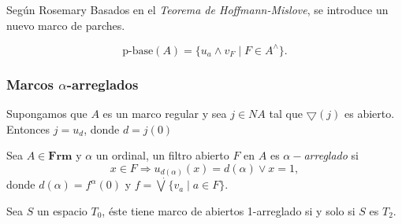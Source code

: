 \documentclass[compress,12pt]{beamer}
\begin{document}
\begin{frame}{Según Rosemary}
    Basados en el \emph{Teorema de Hoffmann-Mislove}, se introduce un nuevo marco de parches.

\[\text{p-base}(A) =\{u_{a}\wedge v_{F}\mid F\in A^{\wedge}\}.\]


\end{frame}

\begin{frame}
\frametitle{Marcos $\alpha$-arreglados}

\begin{theorem}
    Supongamos que $A$ es un marco regular y sea $j\in NA$ tal que $\bigtriangledown (j)$ es abierto. Entonces $j=u_d$, donde $d=j(0)$
\end{theorem}

\end{frame}

\begin{frame}
\begin{definition}
Sea $A\in \mathbf{Frm}$ y $\alpha$ un ordinal, un filtro abierto $F$ en $A$ es $\alpha-$\emph{arreglado} si \[x\in F\Rightarrow u_{d(\alpha)}(x)=d(\alpha)\vee x=1,\] donde $d(\alpha)=f^{\alpha}(0)$ y $f=\dot\bigvee\{v_a\mid a\in F\}$.
\end{definition}


\begin{theorem}
Sea $S$ un espacio $T_{0}$, éste tiene \alert<4->{marco de abiertos 1-arreglado si y solo si $S$ es $T_2$}.
\end{theorem}
\end{frame}
\end{document}
